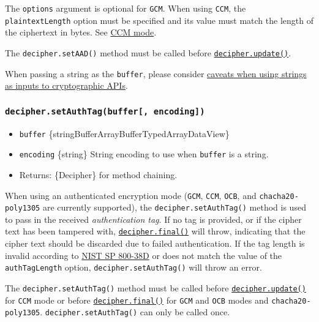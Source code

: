 The \texttt{options} argument is optional for \texttt{GCM}. When using
\texttt{CCM}, the \texttt{plaintextLength} option must be specified and
its value must match the length of the ciphertext in bytes. See
\hyperref[ccm-mode]{CCM mode}.

The \texttt{decipher.setAAD()} method must be called before
\hyperref[decipherupdatedata-inputencoding-outputencoding]{\texttt{decipher.update()}}.

When passing a string as the \texttt{buffer}, please consider
\hyperref[using-strings-as-inputs-to-cryptographic-apis]{caveats when
using strings as inputs to cryptographic APIs}.

\subsubsection{\texorpdfstring{\texttt{decipher.setAuthTag(buffer{[},\ encoding{]})}}{decipher.setAuthTag(buffer{[}, encoding{]})}}\label{decipher.setauthtagbuffer-encoding}

\begin{itemize}
\tightlist
\item
  \texttt{buffer}
  \{string\textbar Buffer\textbar ArrayBuffer\textbar TypedArray\textbar DataView\}
\item
  \texttt{encoding} \{string\} String encoding to use when
  \texttt{buffer} is a string.
\item
  Returns: \{Decipher\} for method chaining.
\end{itemize}

When using an authenticated encryption mode (\texttt{GCM}, \texttt{CCM},
\texttt{OCB}, and \texttt{chacha20-poly1305} are currently supported),
the \texttt{decipher.setAuthTag()} method is used to pass in the
received \emph{authentication tag}. If no tag is provided, or if the
cipher text has been tampered with,
\hyperref[decipherfinaloutputencoding]{\texttt{decipher.final()}} will
throw, indicating that the cipher text should be discarded due to failed
authentication. If the tag length is invalid according to
\href{https://nvlpubs.nist.gov/nistpubs/Legacy/SP/nistspecialpublication800-38d.pdf}{NIST
SP 800-38D} or does not match the value of the \texttt{authTagLength}
option, \texttt{decipher.setAuthTag()} will throw an error.

The \texttt{decipher.setAuthTag()} method must be called before
\hyperref[decipherupdatedata-inputencoding-outputencoding]{\texttt{decipher.update()}}
for \texttt{CCM} mode or before
\hyperref[decipherfinaloutputencoding]{\texttt{decipher.final()}} for
\texttt{GCM} and \texttt{OCB} modes and \texttt{chacha20-poly1305}.
\texttt{decipher.setAuthTag()} can only be called once.


